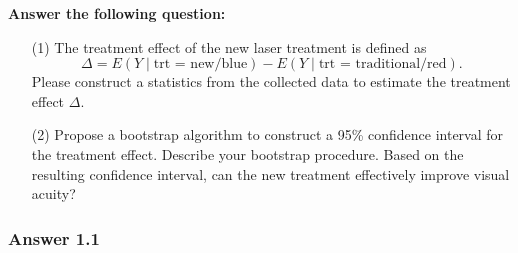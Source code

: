\documentclass[
]{article}
\begin{document}
\vskip 20pt

\textbf{Answer the following question:}

\begin{enumerate}
\item[(1)]  The treatment effect of the new laser treatment is defined as $$\Delta= E(Y\mid \mbox{trt = new/blue}) - E(Y\mid \mbox{trt = traditional/red}).$$  Please construct a statistics from  the collected data to estimate the treatment effect $\Delta$.
\item[(2)] Propose a bootstrap algorithm to construct a 95\% confidence interval for the treatment effect. Describe your bootstrap procedure. Based on the resulting confidence interval, can the new treatment effectively improve visual acuity?
\end{enumerate}

\hypertarget{answer-1.1}{%
\subsubsection{Answer 1.1}\label{answer-1.1}}
\end{document}
